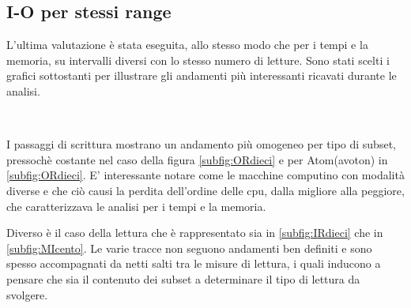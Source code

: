 \subsection{I-O per stessi range}
L'ultima valutazione è stata eseguita, allo stesso modo che per i tempi e la memoria,  su intervalli diversi con lo stesso numero di letture.
Sono stati scelti i grafici sottostanti per illustrare gli andamenti più interessanti ricavati durante le analisi.
\begin{figure}[H]
\centering
{} \quad
{} \\
\end{figure}
\begin{figure}[H]
\ContinuedFloat
\centering
{} \quad
\centering
{} 
\caption{}
\label{fig:IOrng}
\end{figure}

I passaggi di scrittura mostrano un andamento più omogeneo per tipo di subset, pressochè costante nel caso della figura \ref{subfig:ORdieci} e per Atom(avoton) in \ref{subfig:ORdieci}.
E' interessante notare come le macchine computino con modalità diverse e che ciò causi la perdita dell'ordine delle cpu, dalla migliore alla peggiore, che caratterizzava le analisi per i tempi e la memoria.  

Diverso è il caso della lettura che è rappresentato sia in \ref{subfig:IRdieci} che in \ref{subfig:MIcento}.  
Le varie tracce non seguono andamenti ben definiti e sono spesso accompagnati da netti salti tra le misure di lettura, i quali inducono a pensare che sia il contenuto dei subset a determinare il tipo di lettura da svolgere. 
